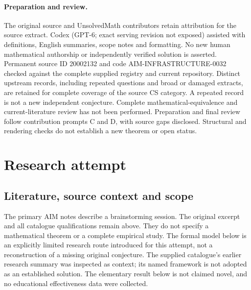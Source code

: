 \documentclass[11pt]{article}
\begin{document}
\paragraph{Preparation and review.}
The original source and UnsolvedMath contributors retain attribution for the source extract. Codex (GPT-6; exact serving revision not exposed) assisted with definitions, English summaries, scope notes and formatting. No new human mathematical authorship or independently verified solution is asserted. Permanent source ID 20002132 and code AIM-INFRASTRUCTURE-0032 checked against the complete supplied registry and current repository. Distinct upstream records, including repeated questions and broad or damaged extracts, are retained for complete coverage of the source CS category. A repeated record is not a new independent conjecture. Complete mathematical-equivalence and current-literature review has not been performed. Preparation and final review follow contribution prompts C and D, with source gaps disclosed. Structural and rendering checks do not establish a new theorem or open status.
\label{end:20002132}

\section{Research attempt}
\subsection{Literature, source context and scope}
The primary AIM notes describe a brainstorming session. The original excerpt and all catalogue qualifications remain above. They do not specify a mathematical theorem or a complete empirical study. The formal model below is an explicitly limited research route introduced for this attempt, not a reconstruction of a missing original conjecture. The supplied catalogue's earlier research summary was inspected as context; its named framework is not adopted as an established solution. The elementary result below is not claimed novel, and no educational effectiveness data were collected.
\end{document}
